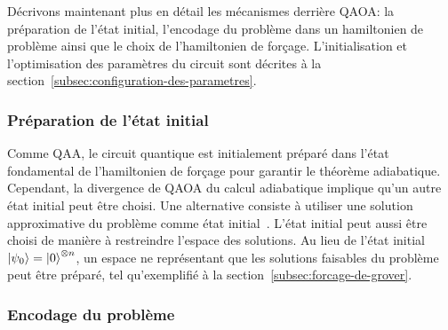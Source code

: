 Décrivons maintenant plus en détail les mécanismes derrière QAOA: la préparation de l'état initial, l'encodage du problème dans un hamiltonien de problème ainsi que le choix de l'hamiltonien de forçage. L'initialisation et l'optimisation des paramètres du circuit sont décrites à la section~\ref{subsec:configuration-des-parametres}.


\subsubsection{Préparation de l'état initial}
\label{subsec:preparation-de-etat-initial}

Comme QAA, le circuit quantique est initialement préparé dans l'état fondamental de l'hamiltonien de forçage pour garantir le théorème adiabatique. Cependant, la divergence de QAOA du calcul adiabatique implique qu'un autre état initial peut être choisi. Une alternative consiste à utiliser une solution approximative du problème comme état initial~\cite{eggerWarmstartingQuantumOptimization2021}. L'état initial peut aussi être choisi de manière à restreindre l'espace des solutions. Au lieu de l'état initial $\ket{\psi_{0}} = \ket{0}^{\otimes n}$, un espace ne représentant que les solutions faisables du problème peut être préparé, tel qu'exemplifié à la section~\ref{subsec:forcage-de-grover}.


\subsubsection{Encodage du problème}
\label{subsec:encodage-probleme}

